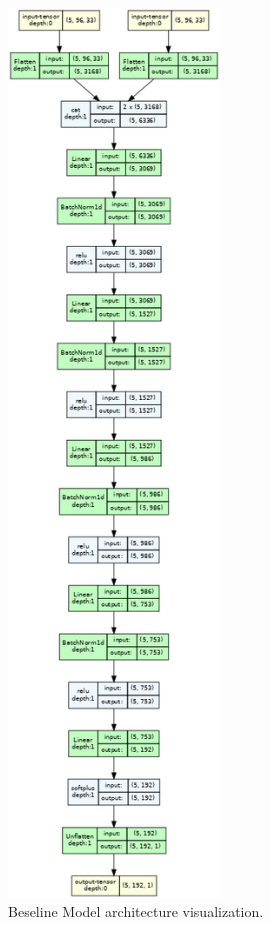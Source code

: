 \begin{figure}[H]
\begin{minipage}{0.6\textwidth}
\begin{itemize}
		\end{itemize}
	\end{minipage}%
	\hspace{0.5cm}
	\begin{minipage}{0.4\textwidth}
		\centering
		\includegraphics[width=0.5\textwidth]{chapters/3_models/imgs/ufcnmodel.png}
		\caption{Beseline Model architecture visualization.}\label{fig:baselinemodelarch}
	\end{minipage}
\end{figure}

